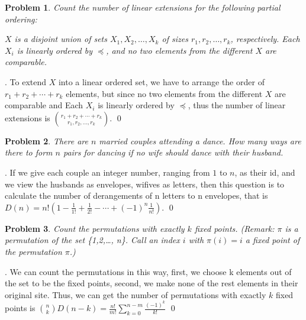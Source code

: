 \documentclass[12pt]{article}
\newtheorem{hw}{Problem}
\newenvironment{sol}
  {\par\vspace{3mm}\noindent{\it Solution}.}
  {\qed}
\begin{document}
\begin{hw}
Count the number of linear extensions for the following partial ordering:

 $X$ is a disjoint union of sets $X_1, X_2,\ldots, X_k$ of sizes $r_1, r_2,\ldots, r_k$, respectively. Each $X_i$ is linearly ordered by $\preceq$, and no two elements from the different $X$ are comparable.
\end{hw}
\begin{sol}
	To extend $X$ into a linear ordered set, we have to arrange the order of $r_1 + r_2 + \cdots + r_k $ elements, but since no two elements from the different $X$ are comparable and Each $X_i$ is linearly ordered by $\preceq$, thus the number of linear extensions is ${r_1 + r_2 + \cdots + r_k \choose r_1, r_2, \dots,r_k }$.
\end{sol}

\begin{hw}
There are $n$ married couples attending a dance. How many ways are there to form $n$ pairs for dancing if no wife should dance with their husband.
\end{hw}
\begin{sol}
	If we give each couple an integer number, ranging from $1$ to $n$, as their id, and we view the husbands as envelopes, wifives as letters, then this question is to calculate the number of derangements of n letters to n envelopes, that is $D(n) = n!(1 - \frac{1}{1!} + \frac{1}{2!} - \cdots + (-1)^{n}\frac{1}{n!})$.
\end{sol}


\begin{hw}
Count the permutations with exactly $k$ fixed points.  (Remark: $\pi$ is a permutation of the set \{1,2,\ldots, n\}. Call an index $i$ with $\pi(i)=i$ a \emph{fixed point} of the permutation $\pi$.)
\end{hw}
\begin{sol}
	We can count the permutations in this way, first, we choose k elements out of the set to be the fixed points, second, we make none of the rest elements in their original site. Thus, we can get the number of permutations with exactly $k$ fixed points is ${n \choose k}D(n-k) = \frac{n!}{m!}\sum_{k=0}^{n-m}\frac{(-1)^{k}}{k!}$
\end{sol}
\end{document}
